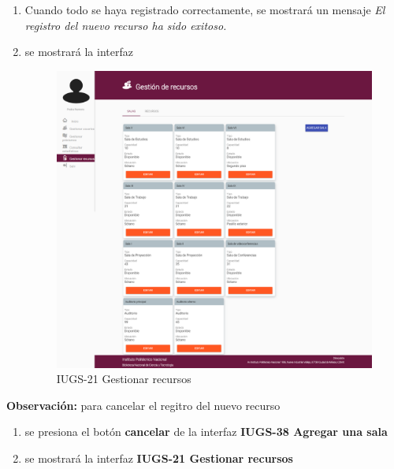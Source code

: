\begin{enumerate}
		\item Cuando todo se haya registrado correctamente, se mostrará 
			un mensaje \textit{El registro del nuevo recurso ha sido exitoso.}	
		\item se mostrará la interfaz \par
			\begin{figure}[hbtp]	
				\centering
					\includegraphics[scale=0.3]{images/Interfaz/IUGS21_GestionarRecursos.png}
					\caption{IUGS-21 Gestionar recursos}
			\end{figure}
	\end{enumerate}		

\textbf{Observación:} para cancelar el regitro del nuevo recurso
		\begin{enumerate}
			\item se presiona el botón \textbf{cancelar} de la interfaz
				\textbf{IUGS-38 Agregar una sala} 
			\item se mostrará la interfaz 	
				\textbf{IUGS-21 Gestionar recursos}
		\end{enumerate}
		
